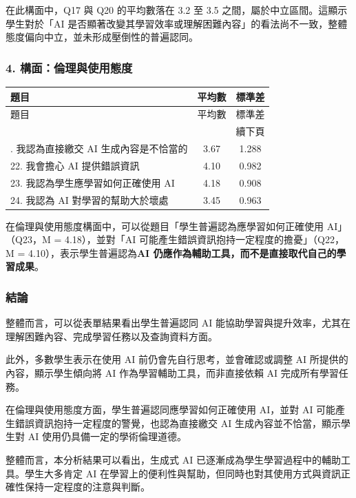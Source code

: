 在此構面中，Q17 與 Q20 的平均數落在 3.2 至 3.5 之間，屬於中立區間。這顯示學生對於「AI 是否顯著改變其學習效率或理解困難內容」的看法尚不一致，整體態度偏向中立，並未形成壓倒性的普遍認同。

\subsubsection{4. 構面：倫理與使用態度}

\begin{longtable}{l c c}
\toprule
題目 & 平均數 & 標準差 \\
\midrule
\endfirsthead
\toprule
題目 & 平均數 & 標準差 \\
\midrule
\endhead
\midrule
\multicolumn{3}{r}{續下頁} \\
\endfoot
\bottomrule
\endlastfoot
21. 我認為直接繳交 AI 生成內容是不恰當的 & 3.67 & 1.288 \\
22. 我會擔心 AI 提供錯誤資訊 & 4.10 & 0.982 \\
23. 我認為學生應學習如何正確使用 AI & 4.18 & 0.908 \\
24. 我認為 AI 對學習的幫助大於壞處 & 3.45 & 0.963 \\
\end{longtable}

在倫理與使用態度構面中，可以從題目「學生普遍認為應學習如何正確使用 AI」（Q23，M = 4.18），並對「AI 可能產生錯誤資訊抱持一定程度的擔憂」（Q22，M = 4.10），表示學生普遍認為\textbf{AI 仍應作為輔助工具，而不是直接取代自己的學習成果}。

\subsubsection{結論}

整體而言，可以從表單結果看出學生普遍認同 AI 能協助學習與提升效率，尤其在理解困難內容、完成學習任務以及查詢資料方面。

此外，多數學生表示在使用 AI 前仍會先自行思考，並會確認或調整 AI 所提供的內容，顯示學生傾向將 AI 作為學習輔助工具，而非直接依賴 AI 完成所有學習任務。

在倫理與使用態度方面，學生普遍認同應學習如何正確使用 AI，並對 AI 可能產生錯誤資訊抱持一定程度的警覺，也認為直接繳交 AI 生成內容並不恰當，顯示學生對 AI 使用仍具備一定的學術倫理道德。

整體而言，本分析結果可以看出，生成式 AI 已逐漸成為學生學習過程中的輔助工具。學生大多肯定 AI 在學習上的便利性與幫助，但同時也對其使用方式與資訊正確性保持一定程度的注意與判斷。
